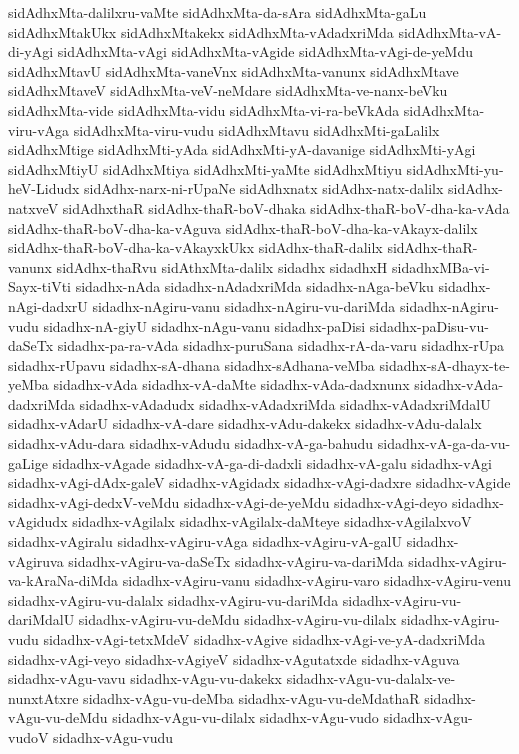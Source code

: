 {sidAdhxMta-dalilxru-vaMte
sidAdhxMta-da-sAra
sidAdhxMta-gaLu
sidAdhxMtakUkx
sidAdhxMtakekx
sidAdhxMta-vAdadxriMda
sidAdhxMta-vA-di-yAgi
sidAdhxMta-vAgi
sidAdhxMta-vAgide
sidAdhxMta-vAgi-de-yeMdu
sidAdhxMtavU
sidAdhxMta-vaneVnx
sidAdhxMta-vanunx
sidAdhxMtave
sidAdhxMtaveV
sidAdhxMta-veV-neMdare
sidAdhxMta-ve-nanx-beVku
sidAdhxMta-vide
sidAdhxMta-vidu
sidAdhxMta-vi-ra-beVkAda
sidAdhxMta-viru-vAga
sidAdhxMta-viru-vudu
sidAdhxMtavu
sidAdhxMti-gaLalilx
sidAdhxMtige
sidAdhxMti-yAda
sidAdhxMti-yA-davanige
sidAdhxMti-yAgi
sidAdhxMtiyU
sidAdhxMtiya
sidAdhxMti-yaMte
sidAdhxMtiyu
sidAdhxMti-yu-heV-Lidudx
sidAdhx-narx-ni-rUpaNe
sidAdhxnatx
sidAdhx-natx-dalilx
sidAdhx-natxveV
sidAdhxthaR
sidAdhx-thaR-boV-dhaka
sidAdhx-thaR-boV-dha-ka-vAda
sidAdhx-thaR-boV-dha-ka-vAguva
sidAdhx-thaR-boV-dha-ka-vAkayx-dalilx
sidAdhx-thaR-boV-dha-ka-vAkayxkUkx
sidAdhx-thaR-dalilx
sidAdhx-thaR-vanunx
sidAdhx-thaRvu
sidAthxMta-dalilx
sidadhx
sidadhxH
sidadhxMBa-vi-Sayx-tiVti
sidadhx-nAda
sidadhx-nAdadxriMda
sidadhx-nAga-beVku
sidadhx-nAgi-dadxrU
sidadhx-nAgiru-vanu
sidadhx-nAgiru-vu-dariMda
sidadhx-nAgiru-vudu
sidadhx-nA-giyU
sidadhx-nAgu-vanu
sidadhx-paDisi
sidadhx-paDisu-vu-daSeTx
sidadhx-pa-ra-vAda
sidadhx-puruSana
sidadhx-rA-da-varu
sidadhx-rUpa
sidadhx-rUpavu
sidadhx-sA-dhana
sidadhx-sAdhana-veMba
sidadhx-sA-dhayx-te-yeMba
sidadhx-vAda
sidadhx-vA-daMte
sidadhx-vAda-dadxnunx
sidadhx-vAda-dadxriMda
sidadhx-vAdadudx
sidadhx-vAdadxriMda
sidadhx-vAdadxriMdalU
sidadhx-vAdarU
sidadhx-vA-dare
sidadhx-vAdu-dakekx
sidadhx-vAdu-dalalx
sidadhx-vAdu-dara
sidadhx-vAdudu
sidadhx-vA-ga-bahudu
sidadhx-vA-ga-da-vu-gaLige
sidadhx-vAgade
sidadhx-vA-ga-di-dadxli
sidadhx-vA-galu
sidadhx-vAgi
sidadhx-vAgi-dAdx-galeV
sidadhx-vAgidadx
sidadhx-vAgi-dadxre
sidadhx-vAgide
sidadhx-vAgi-dedxV-veMdu
sidadhx-vAgi-de-yeMdu
sidadhx-vAgi-deyo
sidadhx-vAgidudx
sidadhx-vAgilalx
sidadhx-vAgilalx-daMteye
sidadhx-vAgilalxvoV
sidadhx-vAgiralu
sidadhx-vAgiru-vAga
sidadhx-vAgiru-vA-galU
sidadhx-vAgiruva
sidadhx-vAgiru-va-daSeTx
sidadhx-vAgiru-va-dariMda
sidadhx-vAgiru-va-kAraNa-diMda
sidadhx-vAgiru-vanu
sidadhx-vAgiru-varo
sidadhx-vAgiru-venu
sidadhx-vAgiru-vu-dalalx
sidadhx-vAgiru-vu-dariMda
sidadhx-vAgiru-vu-dariMdalU
sidadhx-vAgiru-vu-deMdu
sidadhx-vAgiru-vu-dilalx
sidadhx-vAgiru-vudu
sidadhx-vAgi-tetxMdeV
sidadhx-vAgive
sidadhx-vAgi-ve-yA-dadxriMda
sidadhx-vAgi-veyo
sidadhx-vAgiyeV
sidadhx-vAgutatxde
sidadhx-vAguva
sidadhx-vAgu-vavu
sidadhx-vAgu-vu-dakekx
sidadhx-vAgu-vu-dalalx-ve-nunxtAtxre
sidadhx-vAgu-vu-deMba
sidadhx-vAgu-vu-deMdathaR
sidadhx-vAgu-vu-deMdu
sidadhx-vAgu-vu-dilalx
sidadhx-vAgu-vudo
sidadhx-vAgu-vudoV
sidadhx-vAgu-vudu
}
